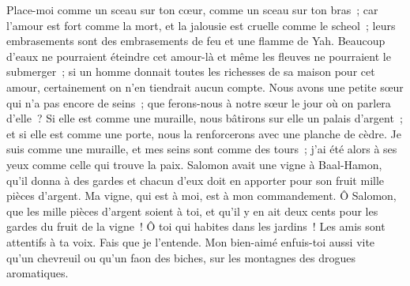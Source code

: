 \begin{multicols}{2}
Place-moi comme un sceau sur ton cœur, comme un sceau sur ton bras~; car l'amour est fort comme la mort, et la jalousie est cruelle comme le scheol~; leurs embrasements sont des embrasements de feu et une flamme de Yah.
 Beaucoup d'eaux ne pourraient éteindre cet amour-là et même les fleuves ne pourraient le submerger~; si un homme donnait toutes les richesses de sa maison pour cet amour, certainement on n'en tiendrait aucun compte.
 Nous avons une petite sœur qui n'a pas encore de seins~; que ferons-nous à notre sœur le jour où on parlera d'elle~?
Si elle est comme une muraille, nous bâtirons sur elle un palais d'argent~; et si elle est comme une porte, nous la renforcerons avec une planche de cèdre.
 Je suis comme une muraille, et mes seins sont comme des tours~; j'ai été alors à ses yeux comme celle qui trouve la paix.
Salomon avait une vigne à Baal-Hamon, qu'il donna à des gardes et chacun d'eux doit en apporter pour son fruit mille pièces d'argent.
Ma vigne, qui est à moi, est à mon commandement. Ô Salomon, que les mille pièces d'argent soient à toi, et qu'il y en ait deux cents pour les gardes du fruit de la vigne~!
 Ô toi qui habites dans les jardins~! Les amis sont attentifs à ta voix.  Fais que je l'entende.
 Mon bien-aimé enfuis-toi aussi vite qu'un chevreuil ou qu'un faon des biches, sur les montagnes des drogues aromatiques.
\PPE{}
\end{multicols}
